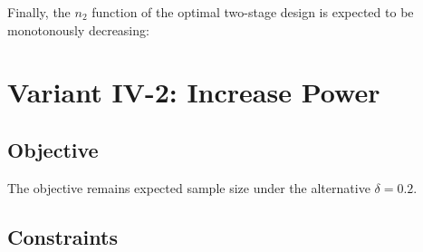 \documentclass[]{book}
\newenvironment{Shaded}{\begin{snugshade}}{\end{snugshade}}
\newcommand{\CommentTok}[1]{\textcolor[rgb]{0.56,0.35,0.01}{\textit{#1}}}
\newcommand{\DecValTok}[1]{\textcolor[rgb]{0.00,0.00,0.81}{#1}}
\newcommand{\KeywordTok}[1]{\textcolor[rgb]{0.13,0.29,0.53}{\textbf{#1}}}
\newcommand{\NormalTok}[1]{#1}
\newcommand{\OperatorTok}[1]{\textcolor[rgb]{0.81,0.36,0.00}{\textbf{#1}}}
\newcommand{\StringTok}[1]{\textcolor[rgb]{0.31,0.60,0.02}{#1}}
\begin{document}
\begin{Shaded}
\end{Shaded}

Finally, the \(n_2\) function of the optimal two-stage design is expected to be
monotonously decreasing:

\begin{Shaded}
\end{Shaded}

\hypertarget{variantIV_2}{%
\section{Variant IV-2: Increase Power}\label{variantIV_2}}

\hypertarget{objective-8}{%
\subsection{Objective}\label{objective-8}}

The objective remains expected sample size under the alternative \(\delta = 0.2\).

\hypertarget{constraints-8}{%
\subsection{Constraints}\label{constraints-8}}
\end{document}
